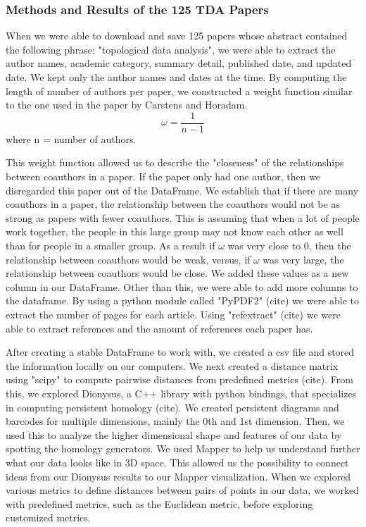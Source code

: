 \documentclass[12pt]{article}
\theoremstyle{definition}
\begin{document}
\subsubsection{Methods and Results of the 125 TDA Papers}

\par When we were able to download and save 125 papers whose abstract contained the following phrase: "topological data analysis", we were able to extract the author names, academic category, summary detail, published date, and updated date. We kept only the author names and dates at the time. By computing the length of number of authors per paper, we constructed a weight function similar to the one used in the paper by Carstens and Horadam.\cite{weights} 
\begin{equation} 
\omega = \frac{1}{n-1} 
\end{equation} where n = number of authors. 
\newline
\par This weight function allowed us to describe the "closeness" of the relationships between coauthors in a paper. If the paper only had one author, then we disregarded this paper out of the DataFrame. We establish that if there are many coauthors in a paper, the relationship between the coauthors would not be as strong as papers with fewer coauthors. This is assuming that when a lot of people work together, the people in this large group may not know each other as well than for people in a smaller group. As a result if $\omega$ was very close to 0, then the relationship between coauthors would be weak, versus, if $\omega$ was very large, the relationship between coauthors would be close. We added these values as a new column in our DataFrame. Other than this, we were able to add more columns to the dataframe. By using a python module called "PyPDF2" (cite) we were able to extract the number of pages for each article. Using "refextract" (cite) we were able to extract references and the amount of references each paper has. 
\newline 
\par After creating a stable DataFrame to work with, we created a csv file and stored the information locally on our computers. We next created a distance matrix using "scipy" to compute pairwise distances from predefined metrics (cite). From this, we explored Dionysus, a C++ library with python bindings, that specializes in computing persistent homology (cite). We created persistent diagrams and barcodes for multiple dimensions, mainly the 0th and 1st dimension. Then, we used this to analyze the higher dimensional shape and features of our data by spotting the homology generators. We used Mapper to help us understand further what our data looks like in 3D space. This allowed us the possibility to connect ideas from our Dionysus results to our Mapper visualization. When we explored various metrics to define distances between pairs of points in our data, we worked with predefined metrics, such as the Euclidean metric, before exploring customized metrics. 
\end{document}
